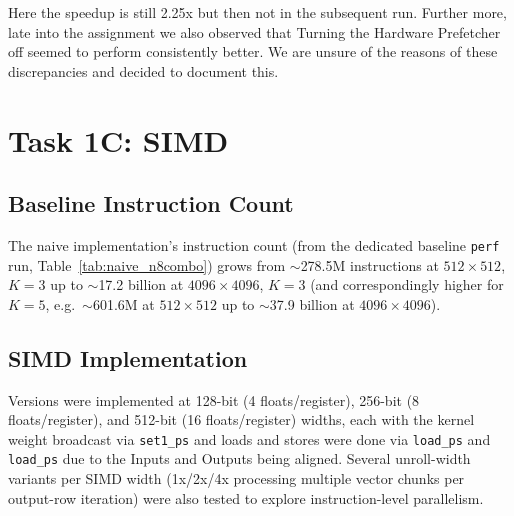 \documentclass[11pt]{article}
\begin{document}
Here the speedup is still 2.25x but then not in the subsequent run. Further more, late into the assignment we also observed that Turning the Hardware Prefetcher off seemed to perform consistently better. We are unsure of the reasons of these discrepancies and decided to document this.



\section{Task 1C: SIMD}

\subsection{Baseline Instruction Count}
The naive implementation's instruction count (from the dedicated baseline \texttt{perf} run, Table~\ref{tab:naive_n8combo}) grows from $\sim$278.5M instructions at $512\times512$, $K{=}3$ up to $\sim$17.2 billion at $4096\times4096$, $K{=}3$ (and correspondingly higher for $K{=}5$, e.g.\ $\sim$601.6M at $512\times512$ up to $\sim$37.9 billion at $4096\times4096$).

\subsection{SIMD Implementation}
Versions were implemented at 128-bit (4 floats/register), 256-bit (8 floats/register), and 512-bit (16
floats/register) widths, each with the kernel weight broadcast via \verb|set1_ps| and loads and stores were done via \verb|load_ps| and \verb|load_ps| due to the Inputs and Outputs being aligned. Several unroll-width variants per SIMD width (1x/2x/4x processing multiple vector chunks per output-row iteration) were also tested to explore instruction-level parallelism.
\end{document}
